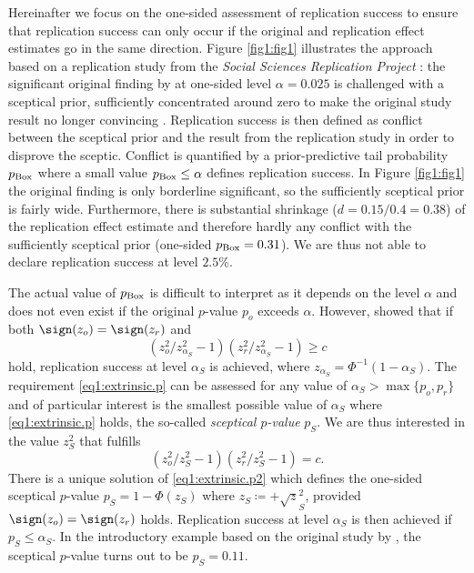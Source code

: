 Hereinafter we focus on the one-sided assessment of replication success to
ensure that replication success can only occur if the original and replication
effect estimates go in the same direction. Figure \ref{fig1:fig1} illustrates the
\citet{Held2020} approach based on a replication study from the \textit{Social
  Sciences Replication Project} \citep{Camerer2018}: the significant original
finding by \citet{Pyc2010} at one-sided level $\alpha=0.025$ is challenged with
a sceptical prior, sufficiently concentrated around zero to make the original
study result no longer convincing \citep{Matthews2001a,Matthews2001b}.
Replication success is then defined as conflict between the sceptical prior and
the result from the replication study in order to disprove the sceptic. Conflict
is quantified by a prior-predictive tail probability $p_{\mbox{\scriptsize
    Box}}$ \citep{Box1980} where a small value $p_{\mbox{\scriptsize
    Box}} \leq \alpha$ defines replication success. In Figure \ref{fig1:fig1} the
original finding is only borderline significant, so the sufficiently sceptical
prior is fairly wide. Furthermore, there is substantial shrinkage
($d = 0.15/0.4 = 0.38$) of the replication effect estimate and therefore hardly
any conflict with the sufficiently sceptical prior (one-sided
$p_{\mbox{\scriptsize Box}}=0.31$). We are thus not able to declare replication
success at level $2.5$\%.

The actual value of $p_{\mbox{\scriptsize Box}}$ is difficult to interpret as it
depends on the level $\alpha$ and does not even exist if the original $p$-value
$p_o$ exceeds $\alpha$. However, \citet{Held2020} showed that if both
$\sign(z_o)=\sign(z_r)$ and
\begin{equation}\label{eq1:extrinsic.p}
\left({z_o^2}/{z_{{\alpha_S}}^2}-1 \right) \left({z_r^2}/{z_{{\alpha_S}}^2}
- 1 \right) \geq c
\end{equation}
hold, replication success at level ${\alpha_S}$ is achieved, where
$z_{{\alpha_S}} = \Phi^{-1}(1-{\alpha_S})$. The requirement
\eqref{eq1:extrinsic.p} can be assessed for any value of
${{\alpha_S}} > \max\{p_o, p_r\}$ and of particular interest is the smallest
possible value of $\alpha_S$ where \eqref{eq1:extrinsic.p} holds, the so-called
\textit{sceptical $p$-value} $p_S$. We are thus interested in the value $z_S^2$
that fulfills
\begin{equation}\label{eq1:extrinsic.p2}
\left({z_o^2}/{z_{S}^2}-1 \right) \left({z_r^2}/{z_{S}^2}
- 1 \right) = c.
\end{equation}
There is a unique solution of \eqref{eq1:extrinsic.p2} which defines the
one-sided {sceptical $p$-value} $p_S= 1-\Phi\left({z_S}\right)$ where
$z_{S} \coloneqq + \surd z_{S}^2$, provided $\sign(z_o)=\sign(z_r)$ holds.
Replication success at level $\alpha_S$ is then achieved if $p_S \leq \alpha_S$.
In the introductory example based on the original study by \citet{Pyc2010}, the
sceptical $p$-value turns out to be $p_S=0.11$.

